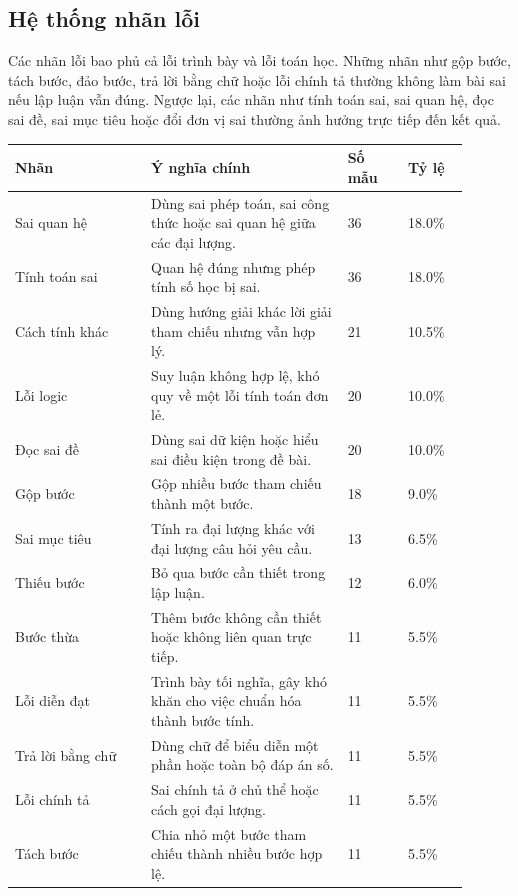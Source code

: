 \documentclass[12pt,a4paper]{article}
\begin{document}
\subsection{Hệ thống nhãn lỗi}

Các nhãn lỗi bao phủ cả lỗi trình bày và lỗi toán học. Những nhãn như gộp bước,
tách bước, đảo bước, trả lời bằng chữ hoặc lỗi chính tả thường không làm bài sai
nếu lập luận vẫn đúng. Ngược lại, các nhãn như tính toán sai, sai quan hệ, đọc
sai đề, sai mục tiêu hoặc đổi đơn vị sai thường ảnh hưởng trực tiếp đến kết quả.

\begin{table}[H]
    \centering
    \small
    \begin{tabular}{p{0.27\linewidth} p{0.39\linewidth} p{0.12\linewidth} p{0.12\linewidth}}
        \toprule
        \textbf{Nhãn} & \textbf{Ý nghĩa chính} & \textbf{Số mẫu} & \textbf{Tỷ lệ} \\
        \midrule
        Sai quan hệ & Dùng sai phép toán, sai công thức hoặc sai quan hệ giữa các đại lượng. & 36 & 18.0\% \\
        Tính toán sai & Quan hệ đúng nhưng phép tính số học bị sai. & 36 & 18.0\% \\
        Cách tính khác & Dùng hướng giải khác lời giải tham chiếu nhưng vẫn hợp lý. & 21 & 10.5\% \\
        Lỗi logic & Suy luận không hợp lệ, khó quy về một lỗi tính toán đơn lẻ. & 20 & 10.0\% \\
        Đọc sai đề & Dùng sai dữ kiện hoặc hiểu sai điều kiện trong đề bài. & 20 & 10.0\% \\
        Gộp bước & Gộp nhiều bước tham chiếu thành một bước. & 18 & 9.0\% \\
        Sai mục tiêu & Tính ra đại lượng khác với đại lượng câu hỏi yêu cầu. & 13 & 6.5\% \\
        Thiếu bước & Bỏ qua bước cần thiết trong lập luận. & 12 & 6.0\% \\
        Bước thừa & Thêm bước không cần thiết hoặc không liên quan trực tiếp. & 11 & 5.5\% \\
        Lỗi diễn đạt & Trình bày tối nghĩa, gây khó khăn cho việc chuẩn hóa thành bước tính. & 11 & 5.5\% \\
        Trả lời bằng chữ & Dùng chữ để biểu diễn một phần hoặc toàn bộ đáp án số. & 11 & 5.5\% \\
        Lỗi chính tả & Sai chính tả ở chủ thể hoặc cách gọi đại lượng. & 11 & 5.5\% \\
        Tách bước & Chia nhỏ một bước tham chiếu thành nhiều bước hợp lệ. & 11 & 5.5\% \\

\end{tabular}
\end{table}
\end{document}

